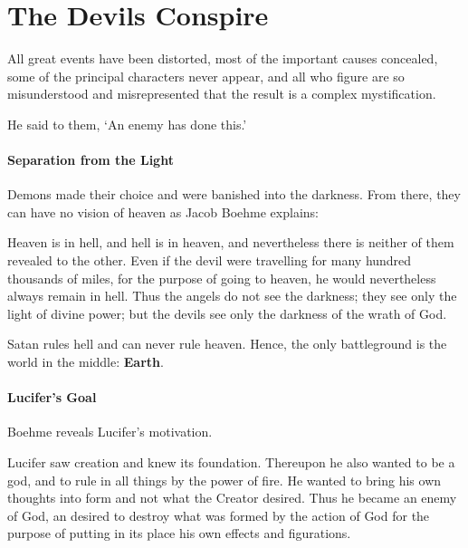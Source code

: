 \section{The Devils Conspire}

\begin{quotex}
All great events have been distorted, most of the important causes concealed, some of the principal characters never appear, and all who figure are so misunderstood and misrepresented that the result is a complex mystification. 

He said to them, `An enemy has done this.' 

\end{quotex}
\paragraph{Separation from the Light}
Demons made their choice and were banished into the darkness. From there, they can have no vision of heaven as Jacob Boehme explains:

\begin{quotex}
Heaven is in hell, and hell is in heaven, and nevertheless there is neither of them revealed to the other. Even if the devil were travelling for many hundred thousands of miles, for the purpose of going to heaven, he would nevertheless always remain in hell. Thus the angels do not see the darkness; they see only the light of divine power; but the devils see only the darkness of the wrath of God. 

\end{quotex}
Satan rules hell and can never rule heaven. Hence, the only battleground is the world in the middle: \textbf{Earth}.

\paragraph{Lucifer's Goal}
Boehme reveals Lucifer's motivation.

\begin{quotex}
Lucifer saw creation and knew its foundation. Thereupon he also wanted to be a god, and to rule in all things by the power of fire. He wanted to bring his own thoughts into form and not what the Creator desired. Thus he became an enemy of God, an desired to destroy what was formed by the action of God for the purpose of putting in its place his own effects and figurations. 

\end{quotex}
